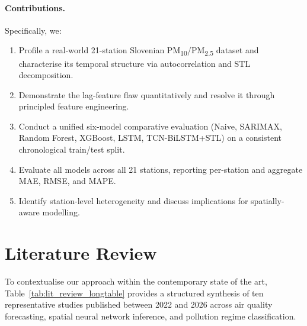 \documentclass[runningheads]{llncs}
\begin{document}
\paragraph{Contributions.} Specifically, we:
\begin{enumerate}
  \item Profile a real-world 21-station Slovenian PM\textsubscript{10}/PM\textsubscript{2.5}
        dataset and characterise its temporal structure via autocorrelation
        and STL decomposition.
  \item Demonstrate the lag-feature flaw quantitatively and resolve it
        through principled feature engineering.
  \item Conduct a unified six-model comparative evaluation (Naive,
        SARIMAX, Random Forest, XGBoost, LSTM, TCN-BiLSTM+STL) on a
        consistent chronological train/test split.
  \item Evaluate all models across all 21 stations, reporting per-station
        and aggregate MAE, RMSE, and MAPE.
  \item Identify station-level heterogeneity and discuss implications for
        spatially-aware modelling.
\end{enumerate}

\section{Literature Review}

To contextualise our approach within the contemporary state of the art, Table~\ref{tab:lit_review_longtable} provides a structured synthesis of ten representative studies published between 2022 and 2026 across air quality forecasting, spatial neural network inference, and pollution regime classification.
\end{document}
